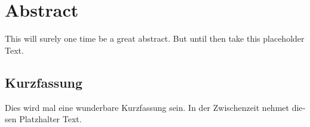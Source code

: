 \thispagestyle{empty} 

\section*{Abstract}

This will surely one time be a great abstract. 
But until then take this placeholder Text.

\thispagestyle{empty} 

\begin{otherlanguage}{ngerman}
\section*{Kurzfassung}
Dies wird mal eine wunderbare Kurzfassung sein.
In der Zwischenzeit nehmet diesen Platzhalter Text.
\end{otherlanguage}
